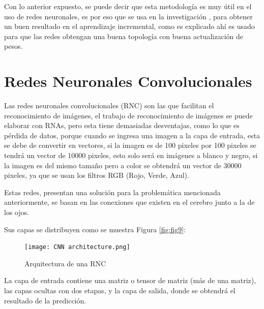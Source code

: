             Con lo anterior expuesto, se puede decir
            que esta metodolog\'ia es muy \'util en el uso de redes neuronales, es por eso que 
            se usa en la investigaci\'on \cite{bullinaria2009}, para obtener un buen resultado
            en el aprendizaje incremental, como es explicado ah\'i es usado para que las redes obtengan una buena topolog\'ia con 
            buena actualizaci\'on de pesos.

        \section{Redes Neuronales Convolucionales}
        	
        	
            Las redes neuronales convolucionales (RNC) son las que facilitan el reconocimiento de imágenes, el trabajo de reconocimiento de
            imágenes se puede elaborar con RNAs, pero esta tiene demasiadas desventajas, como lo que es p\'erdida de datos, porque cuando se 
            ingresa una imagen a la capa de entrada, esta se debe de convertir en vectores, si la imagen es de 100 pixeles por 100 pixeles
            se tendrá un vector de 10000 pixeles, esto solo ser\'a en imágenes a blanco y negro, si la imagen es del mismo tamaño pero a color
            se obtendrá un vector de 30000 pixeles, ya que se usan los filtros RGB (Rojo, Verde, Azul).

            Estas redes, presentan una soluci\'on para la problemática mencionada anteriormente, se basan en las conexiones que existen en 
            el cerebro junto a la de los ojos.

            Sus capas se distribuyen como se muestra Figura \eqref{fig:fig9}:
            
            
            \begin{figure}[H]
                \centering
                \texttt{[image: CNN architecture.png]}
                \caption{Arquitectura de una RNC}
                \label{fig:fig9}
            \end{figure}

            La capa de entrada contiene una matriz o tensor de matriz (m\'as de una matriz), las capas ocultas con dos etapas, y la 
            capa de salida, donde se obtendrá el resultado de la predicci\'on. \\
            
